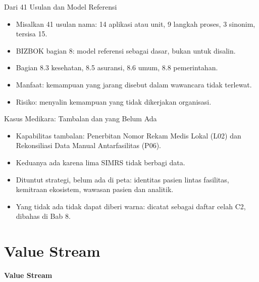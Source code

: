 \documentclass[aspectratio=169, table, 12pt]{beamer}
\begin{document}
\begin{frame}{{\Large Dari 41 Usulan dan Model Referensi}}
  \vspace{10pt}
  \begin{itemize}
    \item Misalkan 41 usulan nama: 14 aplikasi atau unit, 9 langkah proses, 3 sinonim, tersisa 15.
    \item BIZBOK bagian 8: model referensi sebagai dasar, bukan untuk disalin.
    \item Bagian 8.3 kesehatan, 8.5 asuransi, 8.6 umum, 8.8 pemerintahan.
    \item Manfaat: kemampuan yang jarang disebut dalam wawancara tidak terlewat.
    \item Risiko: menyalin kemampuan yang tidak dikerjakan organisasi.
  \end{itemize}
\end{frame}

\begin{frame}{{\Large Kasus Medikara: Tambalan dan yang Belum Ada}}
  \vspace{10pt}
  \begin{itemize}
    \item Kapabilitas tambalan: Penerbitan Nomor Rekam Medis Lokal (L02) dan Rekonsiliasi Data Manual
          Antarfasilitas (P06).
    \item Keduanya ada karena lima SIMRS tidak berbagi data.
    \item Dituntut strategi, belum ada di peta: identitas pasien lintas fasilitas, kemitraan ekosistem,
          wawasan pasien dan analitik.
    \item Yang tidak ada tidak dapat diberi warna: dicatat sebagai daftar celah C2, dibahas di Bab 8.
  \end{itemize}
\end{frame}

\section{Value Stream}

\begin{frame}{\hfill}
  \centering
  \Huge{\textbf{Value Stream}}
\end{frame}
\end{document}
